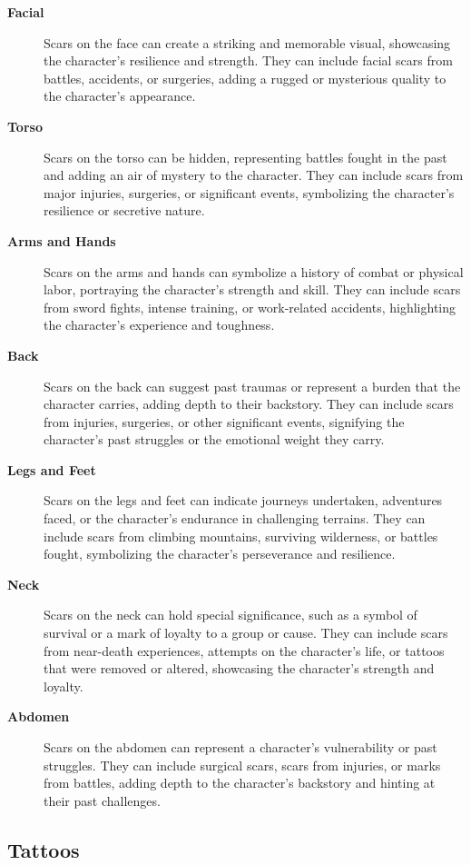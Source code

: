 \documentclass[12pt]{book}  %
\begin{document}
\begin{description}
    \item[\textbf{Facial}] Scars on the face can create a striking and memorable visual, showcasing the character's resilience and strength. They can include facial scars from battles, accidents, or surgeries, adding a rugged or mysterious quality to the character's appearance.
    \item[\textbf{Torso}] Scars on the torso can be hidden, representing battles fought in the past and adding an air of mystery to the character. They can include scars from major injuries, surgeries, or significant events, symbolizing the character's resilience or secretive nature.
    \item[\textbf{Arms and Hands}] Scars on the arms and hands can symbolize a history of combat or physical labor, portraying the character's strength and skill. They can include scars from sword fights, intense training, or work-related accidents, highlighting the character's experience and toughness.
    \item[\textbf{Back}] Scars on the back can suggest past traumas or represent a burden that the character carries, adding depth to their backstory. They can include scars from injuries, surgeries, or other significant events, signifying the character's past struggles or the emotional weight they carry.
    \item[\textbf{Legs and Feet}] Scars on the legs and feet can indicate journeys undertaken, adventures faced, or the character's endurance in challenging terrains. They can include scars from climbing mountains, surviving wilderness, or battles fought, symbolizing the character's perseverance and resilience.
    \item[\textbf{Neck}] Scars on the neck can hold special significance, such as a symbol of survival or a mark of loyalty to a group or cause. They can include scars from near-death experiences, attempts on the character's life, or tattoos that were removed or altered, showcasing the character's strength and loyalty.
    \item[\textbf{Abdomen}] Scars on the abdomen can represent a character's vulnerability or past struggles. They can include surgical scars, scars from injuries, or marks from battles, adding depth to the character's backstory and hinting at their past challenges.
\end{description}

\subsection{\textbf{Tattoos}}
\end{document}
